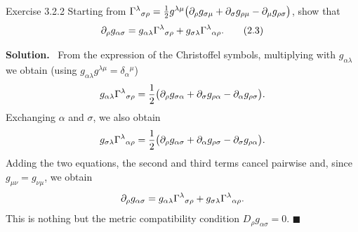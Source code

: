 \documentclass[11pt,a4paper]{article}
\numberwithin{equation}{subsection}
\newenvironment{solution}{\par\noindent\textbf{\textcolor{excol!70!black}{Solution.}}\ }{\hfill$\blacksquare$\par\medskip}
\newcommand{\added}[1]{{\color{teal!60!black}#1}}
\begin{document}
\begin{problem}{Exercise 3.2.2}
Starting from $\Gamma^\lambda{}_{\sigma\rho}=\frac12g^{\lambda\mu}\big(\partial_\rho g_{\sigma\mu}+\partial_\sigma g_{\rho\mu}-\partial_\mu g_{\rho\sigma}\big)$, show that
\[
  \partial_\rho g_{\alpha\sigma}=g_{\alpha\lambda}\Gamma^\lambda{}_{\sigma\rho}+g_{\sigma\lambda}\Gamma^\lambda{}_{\alpha\rho}. \tag{2.3}
\]
\end{problem}
\begin{solution}
From the expression of the Christoffel symbols, multiplying with $g_{\alpha\lambda}$ we obtain (using $g_{\alpha\lambda}g^{\lambda\mu}=\delta_\alpha{}^\mu$)
\[
  g_{\alpha\lambda}\Gamma^\lambda{}_{\sigma\rho}=\frac12\big(\partial_\rho g_{\sigma\alpha}+\partial_\sigma g_{\rho\alpha}-\partial_\alpha g_{\rho\sigma}\big).
\]
Exchanging $\alpha$ and $\sigma$, we also obtain
\[
  g_{\sigma\lambda}\Gamma^\lambda{}_{\alpha\rho}=\frac12\big(\partial_\rho g_{\alpha\sigma}+\partial_\alpha g_{\rho\sigma}-\partial_\sigma g_{\rho\alpha}\big).
\]
Adding the two equations, the second and third terms cancel pairwise and, since $g_{\mu\nu}=g_{\nu\mu}$, we obtain
\[
  \partial_\rho g_{\alpha\sigma}=g_{\alpha\lambda}\Gamma^\lambda{}_{\sigma\rho}+g_{\sigma\lambda}\Gamma^\lambda{}_{\alpha\rho}.
\]
\added{This is nothing but the metric compatibility condition $D_\rho g_{\alpha\sigma}=0$.}
\end{solution}
\end{document}
